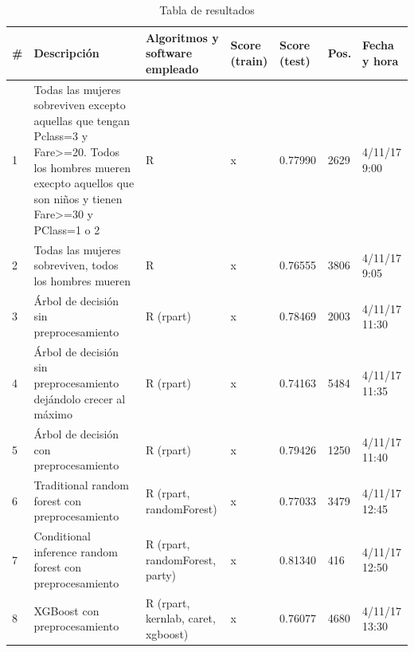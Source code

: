 \begin{table}[H]
	\centering
	\caption{Tabla de resultados}
	\label{tab:results}
	\begin{tabular}{|l|p{5.1cm}p{1.8cm}p{1.2cm}p{1.2cm}p{0.6cm}p{1.5cm}|}
		\hline
		\# & Descripción & Algoritmos y software empleado & Score (train) & Score (test) & Pos. & Fecha y hora \\ \hline \hline
		1  & Todas las mujeres sobreviven excepto aquellas que tengan Pclass=3 y Fare\textgreater=20. Todos los hombres mueren execpto aquellos que son niños y tienen Fare\textgreater=30 y PClass=1 o 2 & R & x & 0.77990 & 2629 & 4/11/17 9:00 \\ \hline
		2  & Todas las mujeres sobreviven, todos los hombres mueren & R & x & 0.76555 & 3806 & 4/11/17 9:05 \\ \hline
		3  & Árbol de decisión sin preprocesamiento & R (rpart) & x & 0.78469 & 2003 & 4/11/17 11:30 \\ \hline
		4  & Árbol de decisión sin preprocesamiento dejándolo crecer al máximo & R (rpart) & x & 0.74163 & 5484 & 4/11/17 11:35 \\ \hline
		5  & Árbol de decisión con preprocesamiento & R (rpart) & x & 0.79426 & 1250 & 4/11/17 11:40 \\ \hline
		6  & Traditional random forest con preprocesamiento & R (rpart, randomForest) & x & 0.77033 & 3479 & 4/11/17 12:45 \\ \hline
		7  & Conditional inference random forest con preprocesamiento & R (rpart, randomForest, party) & x & 0.81340 & 416 & 4/11/17 12:50 \\ \hline
		8  & XGBoost con preprocesamiento & R (rpart, kernlab, caret, xgboost) & x & 0.76077 & 4680 & 4/11/17 13:30 \\ \hline       
	\end{tabular}
\end{table}


\newpage


